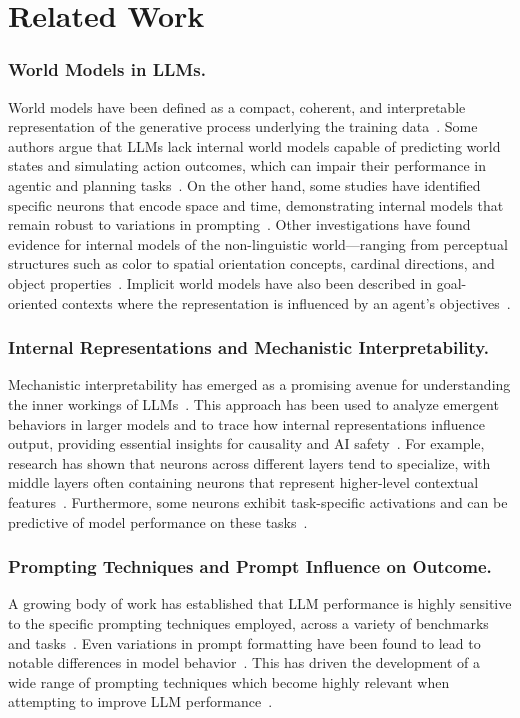 \section{Related Work}
\subsubsection{World Models in LLMs.} World models have been defined as a compact, coherent, and interpretable representation of the generative process underlying the training data~\cite{GurneeTegmark2023,HaSchmidhuber2018,Vafa2024}. Some authors argue that LLMs lack internal world models capable of predicting world states and simulating action outcomes, which can impair their performance in agentic and planning tasks~\cite{Bisk2020,BenderEtAl2021}. On the other hand, some studies have identified specific neurons that encode space and time, demonstrating internal models that remain robust to variations in prompting~\cite{GurneeTegmark2023}. Other investigations have found evidence for internal models of the non-linguistic world—ranging from perceptual structures such as color to spatial orientation concepts, cardinal directions, and object properties~\cite{PatelPavlick2022,LiNyeAndreas2021,Abdou2021}. Implicit world models have also been described in goal-oriented contexts where the representation is influenced by an agent’s objectives~\cite{Li2021}.

\subsubsection{Internal Representations and Mechanistic Interpretability.} Mechanistic interpretability has emerged as a promising avenue for understanding the inner workings of LLMs~\cite{Olah2020,Elhage2021,Templeton2024}. This approach has been used to analyze emergent behaviors in larger models and to trace how internal representations influence output, providing essential insights for causality and AI safety~\cite{Wang2022,Nanda2023,Bereska2024}. For example, research has shown that neurons across different layers tend to specialize, with middle layers often containing neurons that represent higher-level contextual features~\cite{Geva2020,Durrani2022,Meng2022,Gurnee2023}. Furthermore, some neurons exhibit task-specific activations and can be predictive of model performance on these tasks~\cite{Meng2022,Wang2022b,LengXiong2024,Song2024}.

\subsubsection{Prompting Techniques and Prompt Influence on Outcome.} A growing body of work has established that LLM performance is highly sensitive to the specific prompting techniques employed, across a variety of benchmarks and tasks~\cite{Salinas2024,Leidinger2023,Anagnostidis2024}. Even variations in prompt formatting have been found to lead to notable differences in model behavior~\cite{Sclar2023}. This has driven the development of a wide range of prompting techniques which become highly relevant when attempting to improve LLM performance~\cite{Wei2022Chain,Sahoo2024}.

